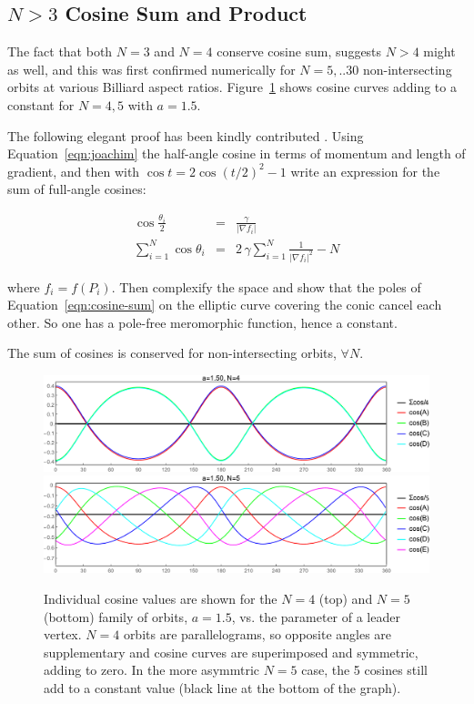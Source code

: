 \subsection{$N>3$ Cosine Sum and Product}

The fact that both $N=3$ and $N=4$ conserve cosine sum, suggests $N>4$ might as well, and this was first confirmed numerically for $N=5,..30$ non-intersecting orbits at various Billiard aspect ratios. Figure~\ref{fig:gen-cos-sum-n45} shows cosine curves adding to a constant for $N=4,5$ with $a=1.5$.

The following elegant proof has been kindly contributed \cite{sergei19_private_meromorphic}. Using Equation~\ref{eqn:joachim} the half-angle cosine in terms of momentum and length of gradient, and then with $\cos{t}=2\cos(t/2)^2-1$ write an expression for the sum of full-angle cosines:

\begin{eqnarray}
\cos\frac{\theta_i}{2} & = & \frac{\gamma}{|\nabla{f_i}|}\\
\sum_{i=1}^{N}{\cos\theta_i} & = & 2\,{\gamma}\sum_{i=1}^{N}\frac{1}{|\nabla{f_i}|^2}-N
\label{eqn:cosine-sum}
\end{eqnarray}

\noindent where $f_i=f(P_i)$. Then complexify the space and show that the poles of Equation~\ref{eqn:cosine-sum} on the elliptic curve covering the conic cancel each other. So one has a pole-free meromorphic function, hence a constant.

\begin{theorem}
The sum of cosines is conserved for non-intersecting orbits, $\forall{N}$.
\end{theorem}

\begin{figure}[H]
    \centering
    \includegraphics[width=\textwidth]{pics/0091_cosine_sum_n4.pdf}
    \includegraphics[width=\textwidth]{pics/0092_cosine_sum_n5.pdf}
    \caption{Individual cosine values are shown for the $N=4$ (top) and $N=5$ (bottom) family of orbits, $a=1.5$, vs. the parameter of a leader vertex. $N=4$ orbits are parallelograms, so opposite angles are supplementary and cosine curves are superimposed and symmetric, adding to zero. In the more asymmtric $N=5$ case, the 5 cosines still add to a constant value (black line at the bottom of the graph).}
    \label{fig:gen-cos-sum-n45}
\end{figure}

